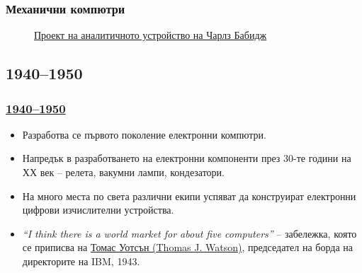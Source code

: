 \documentclass[ignorenonframetext, hyperref=unicode]{beamer}
\begin{document}
\begin{frame}
\frametitle{Механични компютри}
\begin{figure}[h]
\center
{}
\caption{\href{http://cse.stanford.edu/classes/sophomore-college/projects-98/babbage/ana-mech.htm}{Проект 
на аналитичното устройство на Чарлз Бабидж}}
\end{figure}
\end{frame}

\subsection{1940--1950}

\begin{frame}
\frametitle{\href{http://en.wikipedia.org/wiki/History_of_computing_hardware}{1940--1950}}
\begin{itemize}
  \item Разработва се първото поколение електронни компютри.
  \item Напредък в разработването на електронни компоненти през 30-те години на
  ХХ век -- релета, вакумни лампи, кондезатори.
  \item На много места по света различни екипи успяват да конструират електронни
  цифрови изчислителни устройства.
  \item {\em ``I think there is a world market for about five computers''} --
  забележка, която се приписва на
  \href{http://en.wikipedia.org/wiki/Thomas_J._Watson}{Томас Уотсън (Thomas J. Watson)}, 
  председател на борда на директорите на IBM, 1943.  
\end{itemize}
\end{frame}
\end{document}

